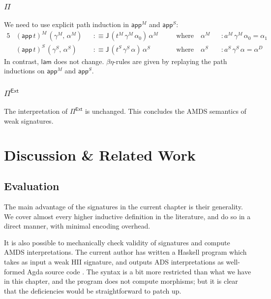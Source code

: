 \documentclass[12pt,a4paper,twoside,openany]{book}
\theoremstyle{remark}
\theoremstyle{definition}
\theoremstyle{theorem}
\newcommand{\ms}[1]{\mathsf{#1}}
\newcommand{\J}{\ms{J}}
\newcommand{\Pie}{\Pi^{\mathsf{Ext}}}
\newcommand{\app}{\ms{app}}
\newcommand{\lam}{\ms{lam}}
\newcommand{\defn}{:\equiv}
\begin{document}
\subsubsection{$\ms{\Pi}$}
We need to use explicit path induction in $\app^M$ and $\app^S$:
\begin{alignat*}{5}
  & (\app\,t)^M\,(\gamma^M,\,\alpha^M) &&\defn \J\,(t^M\,\gamma^M\,\alpha_0)\,\alpha^M &&\hspace{1em}\text{where}\hspace{1em} \alpha^M &&: a^M\,\gamma^M\,\alpha_0 = \alpha_1\\
  & (\app\,t)^S\,(\gamma^S,\,\alpha^S) &&\defn \J\,(t^S\,\gamma^S\,\alpha)\,\alpha^S &&\hspace{1em}\text{where}\hspace{1em} \alpha^S &&: a^S\,\gamma^S\,\alpha = \alpha^D
\end{alignat*}
In contrast, $\lam$ does not change. $\beta\eta$-rules are given by replaying
the path inductions on $\app^M$ and $\app^S$.

\subsubsection{$\ms{\Pie}$}

The interpretation of $\ms{\Pie}$ is unchanged. This concludes the AMDS semantics of weak signatures.

\section{Discussion \& Related Work}

\subsection{Evaluation}

The main advantage of the signatures in the current chapter is their generality.
We cover almost every higher inductive definition in the literature, and do so
in a direct manner, with minimal encoding overhead.

It is also possible to mechanically check validity of signatures and compute
AMDS interpretations. The current author has written a Haskell program which
takes as input a weak HII signature, and outputs ADS interpretations as
well-formed Agda source code \cite{hiit-sig-program}. The syntax is a bit more
restricted than what we have in this chapter, and the program does not compute
morphisms; but it is clear that the deficiencies would be straightforward to
patch up.
\end{document}

